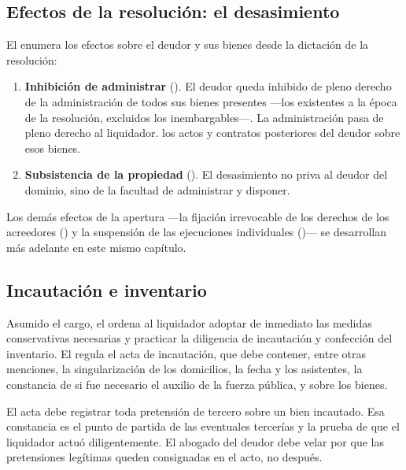 
\subsection{Efectos de la resolución: el desasimiento}

El  enumera los efectos sobre el deudor y sus bienes desde la dictación de la
resolución:

\begin{enumerate}
  \item \textbf{Inhibición de administrar} (). El deudor queda inhibido de pleno
  derecho de la administración de todos sus bienes presentes ---los existentes a la época de
  la resolución, excluidos los inembargables---. La administración pasa de pleno derecho al
  liquidador.  los actos y contratos posteriores del deudor sobre esos
  bienes.
  \item \textbf{Subsistencia de la propiedad} (). El desasimiento no priva al deudor
  del dominio, sino de la facultad de administrar y disponer.
\end{enumerate}

Los demás efectos de la apertura ---la fijación irrevocable de los derechos de los acreedores
() y la suspensión de las ejecuciones individuales ()--- se desarrollan más
adelante en este mismo capítulo.

\subsection{Incautación e inventario}

Asumido el cargo, el  ordena al liquidador adoptar de inmediato las medidas
conservativas necesarias y practicar la diligencia de incautación y confección del
inventario. El  regula el acta de incautación, que debe contener, entre otras
menciones, la singularización de los domicilios, la fecha y los asistentes, la constancia
de si fue necesario el auxilio de la fuerza pública, y  sobre los bienes.

\begin{practica}
El acta debe registrar toda pretensión de tercero sobre un bien incautado. Esa constancia
es el punto de partida de las eventuales tercerías y la prueba de que el liquidador actuó
diligentemente. El abogado del deudor debe velar por que las pretensiones legítimas queden
consignadas en el acto, no después.
\end{practica}


